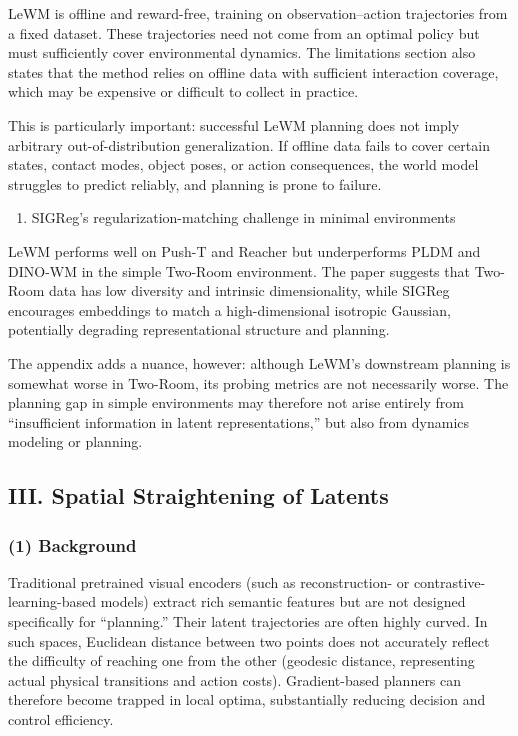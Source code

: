 LeWM is offline and reward-free, training on observation--action trajectories from a fixed dataset. These trajectories need not come from an optimal policy but must sufficiently cover environmental dynamics. The limitations section also states that the method relies on offline data with sufficient interaction coverage, which may be expensive or difficult to collect in practice.

This is particularly important: successful LeWM planning does not imply arbitrary out-of-distribution generalization. If offline data fails to cover certain states, contact modes, object poses, or action consequences, the world model struggles to predict reliably, and planning is prone to failure.

\begin{enumerate}
\def\labelenumi{\arabic{enumi}.}
\setcounter{enumi}{4}
\tightlist
\item
  SIGReg's regularization-matching challenge in minimal environments
\end{enumerate}

LeWM performs well on Push-T and Reacher but underperforms PLDM and DINO-WM in the simple Two-Room environment. The paper suggests that Two-Room data has low diversity and intrinsic dimensionality, while SIGReg encourages embeddings to match a high-dimensional isotropic Gaussian, potentially degrading representational structure and planning.

The appendix adds a nuance, however: although LeWM's downstream planning is somewhat worse in Two-Room, its probing metrics are not necessarily worse. The planning gap in simple environments may therefore not arise entirely from ``insufficient information in latent representations,'' but also from dynamics modeling or planning.

\hypertarget{iii.-spatial-straightening-of-latents}{%
\subsection{III. Spatial Straightening of Latents}\label{iii.-spatial-straightening-of-latents}}

\hypertarget{background-6}{%
\subsubsection{(1) Background}\label{background-6}}

Traditional pretrained visual encoders (such as reconstruction- or contrastive-learning-based models) extract rich semantic features but are not designed specifically for ``planning.'' Their latent trajectories are often highly curved. In such spaces, Euclidean distance between two points does not accurately reflect the difficulty of reaching one from the other (geodesic distance, representing actual physical transitions and action costs). Gradient-based planners can therefore become trapped in local optima, substantially reducing decision and control efficiency.

